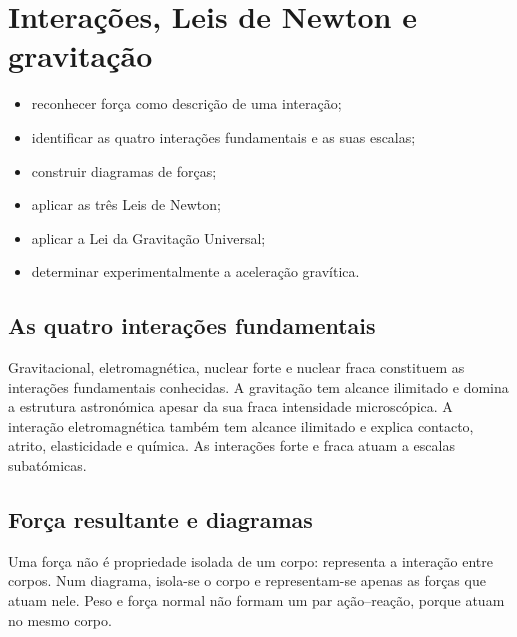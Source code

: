 \documentclass[11pt,a4paper,oneside]{book}
\newcommand{\vect}[1]{\boldsymbol{#1}}
\begin{document}
\chapter{Interações, Leis de Newton e gravitação}
\begin{objetivos}
\begin{itemize}
  \item reconhecer força como descrição de uma interação;
  \item identificar as quatro interações fundamentais e as suas escalas;
  \item construir diagramas de forças;
  \item aplicar as três Leis de Newton;
  \item aplicar a Lei da Gravitação Universal;
  \item determinar experimentalmente a aceleração gravítica.
\end{itemize}
\end{objetivos}

\section{As quatro interações fundamentais}
Gravitacional, eletromagnética, nuclear forte e nuclear fraca constituem as interações fundamentais conhecidas. A gravitação tem alcance ilimitado e domina a estrutura astronómica apesar da sua fraca intensidade microscópica. A interação eletromagnética também tem alcance ilimitado e explica contacto, atrito, elasticidade e química. As interações forte e fraca atuam a escalas subatómicas.

\section{Força resultante e diagramas}
Uma força não é propriedade isolada de um corpo: representa a interação entre corpos. Num diagrama, isola-se o corpo e representam-se apenas as forças que atuam nele. Peso e força normal não formam um par ação--reação, porque atuam no mesmo corpo.

\begin{center}
\end{center}
\end{document}
